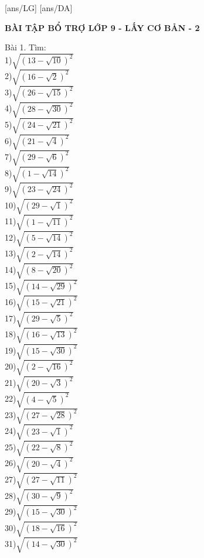 \documentclass[12pt,a4paper]{article}
\begin{document}
	[ans/LG]
	[ans/DA]
	\pagestyle{fancy}
	\fancyhf{}
	\begin{center}
		{\bf\Large BÀI TẬP BỔ TRỢ LỚP 9 - LẤY CƠ BẢN - 2}
	\end{center}
Bài 1. Tìm:\\
1)$\sqrt{(13-\sqrt{10})^2}$\\
2)$\sqrt{(16-\sqrt{2})^2}$\\
3)$\sqrt{(26-\sqrt{15})^2}$\\
4)$\sqrt{(28-\sqrt{30})^2}$\\
5)$\sqrt{(24-\sqrt{21})^2}$\\
6)$\sqrt{(21-\sqrt{4})^2}$\\
7)$\sqrt{(29-\sqrt{6})^2}$\\
8)$\sqrt{(1-\sqrt{14})^2}$\\
9)$\sqrt{(23-\sqrt{24})^2}$\\
10)$\sqrt{(29-\sqrt{1})^2}$\\
11)$\sqrt{(1-\sqrt{11})^2}$\\
12)$\sqrt{(5-\sqrt{14})^2}$\\
13)$\sqrt{(2-\sqrt{14})^2}$\\
14)$\sqrt{(8-\sqrt{20})^2}$\\
15)$\sqrt{(14-\sqrt{29})^2}$\\
16)$\sqrt{(15-\sqrt{21})^2}$\\
17)$\sqrt{(29-\sqrt{5})^2}$\\
18)$\sqrt{(16-\sqrt{13})^2}$\\
19)$\sqrt{(15-\sqrt{30})^2}$\\
20)$\sqrt{(2-\sqrt{16})^2}$\\
21)$\sqrt{(20-\sqrt{3})^2}$\\
22)$\sqrt{(4-\sqrt{5})^2}$\\
23)$\sqrt{(27-\sqrt{28})^2}$\\
24)$\sqrt{(23-\sqrt{1})^2}$\\
25)$\sqrt{(22-\sqrt{8})^2}$\\
26)$\sqrt{(20-\sqrt{4})^2}$\\
27)$\sqrt{(27-\sqrt{11})^2}$\\
28)$\sqrt{(30-\sqrt{9})^2}$\\
29)$\sqrt{(15-\sqrt{30})^2}$\\
30)$\sqrt{(18-\sqrt{16})^2}$\\
31)$\sqrt{(14-\sqrt{30})^2}$\\
\end{document}
